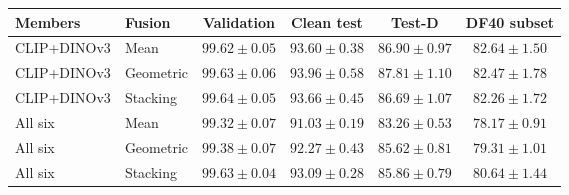 \begin{tabular}{llcccc}
\toprule
Members & Fusion & Validation & Clean test & Test-D & DF40 subset \\
\midrule
CLIP+DINOv3 & Mean & $99.62 \pm 0.05$ & $93.60 \pm 0.38$ & $86.90 \pm 0.97$ & $82.64 \pm 1.50$ \\
CLIP+DINOv3 & Geometric & $99.63 \pm 0.06$ & $93.96 \pm 0.58$ & $87.81 \pm 1.10$ & $82.47 \pm 1.78$ \\
CLIP+DINOv3 & Stacking & $99.64 \pm 0.05$ & $93.66 \pm 0.45$ & $86.69 \pm 1.07$ & $82.26 \pm 1.72$ \\
All six & Mean & $99.32 \pm 0.07$ & $91.03 \pm 0.19$ & $83.26 \pm 0.53$ & $78.17 \pm 0.91$ \\
All six & Geometric & $99.38 \pm 0.07$ & $92.27 \pm 0.43$ & $85.62 \pm 0.81$ & $79.31 \pm 1.01$ \\
All six & Stacking & $99.63 \pm 0.04$ & $93.09 \pm 0.28$ & $85.86 \pm 0.79$ & $80.64 \pm 1.44$ \\
\bottomrule
\end{tabular}
